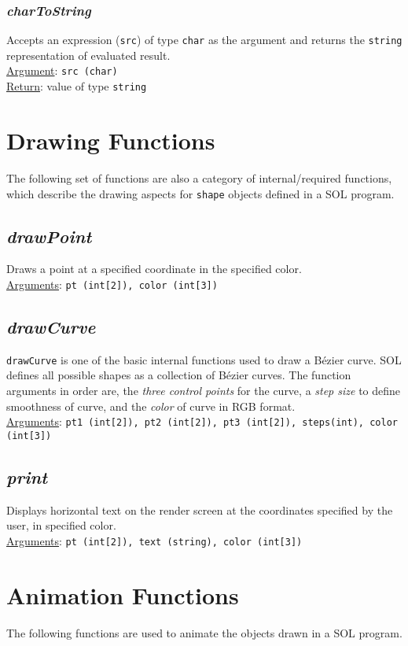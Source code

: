     \subsubsection{\textit{charToString}}
    Accepts an expression (\texttt{src}) of type \texttt{char} as the argument and returns the \texttt{string} representation of evaluated result.\\
    \underline{Argument}: \texttt{src (char)}\\
    \underline{Return}: value of type \texttt{string}

\section{Drawing Functions}
The following set of functions are also a category of internal/required functions, which describe the drawing aspects for \texttt{shape} objects defined in a SOL program.

    \subsection{\textit{drawPoint}}
    Draws a point at a specified coordinate in the specified color.\\
    \underline{Arguments}: \texttt{pt (int[2]), color (int[3])}

    \subsection{\textit{drawCurve}}
    \texttt{drawCurve} is one of the basic internal functions used to draw a B\'ezier curve. SOL defines all possible shapes as a collection of B\'ezier curves. The function arguments in order are, the \textit{three control points} for the curve, a \textit{step size} to define smoothness of curve, and the \textit{color} of curve in RGB format.\\
    \underline{Arguments}: \texttt{pt1 (int[2]), pt2 (int[2]), pt3 (int[2]), steps(int), color (int[3])}

    \subsection{\textit{print}}
    Displays horizontal text on the render screen at the coordinates specified by the user, in specified color.\\
    \underline{Arguments}: \texttt{pt (int[2]), text (string), color (int[3])}

\section{Animation Functions} \label{animation}
The following functions are used to animate the objects drawn in a SOL program.

